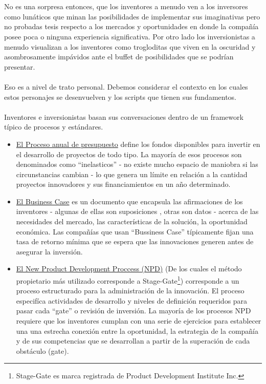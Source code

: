 \documentclass{article}
\begin{document}
\\ \\
No es una sorpresa entonces, que los inventores a menudo ven a los inversores como lun\'aticos que minan las posibilidades de implementar sus imaginativas pero no probadas tesis respecto a los mercados y oportunidades en donde la compa\~n\'ia posee poca o ninguna experiencia significativa. Por otro lado los inversionistas a menudo visualizan a los inventores como trogloditas que viven en la oscuridad y asombrosamente imp\'avidos ante el buffet de posibilidades que se podr\'ian presentar.
\\ \\
Eso es a nivel de trato personal. Debemos considerar el contexto en los cuales estos personajes se desenvuelven y los scripts que tienen sus fundamentos. 
\\ \\
Inventores e inversionistas basan sus conversaciones dentro de un framework t\'ipico de procesos y est\'andares.

\begin{itemize}
  \item \underline{El Proceso anual de presupuesto} define los fondos disponibles para invertir en el desarrollo de proyectos de todo tipo. La mayor\'ia  de esos procesos son denominados como ``inelasticos'' - no existe mucho espacio de maniobra si las circunstancias cambian - lo que genera un l\'imite en relaci\'on a la cantidad proyectos innovadores y sus financiamientos en un a\~no determinado.
  
  \item \underline{El Business Case} es un documento que encapsula las afirmaciones de los inventores - algunas de ellas son suposiciones , otras son datos  - acerca de las necesidades del mercado, las caracter\'isticas de la soluci\'on, la oportunidad econ\'omica. Las compa\~n\'ias que usan ``Bussiness Case'' t\'ipicamente fijan una tasa de retorno m\'inima que se espera que las innovaciones generen antes de asegurar la inversi\'on.
  
  \item \underline{El New Product Development Proccess (NPD)} (De los cuales el m\'etodo propietario m\'as utilizado corresponde a Stage-Gate\footnote{Stage-Gate es marca registrada de Product Development Institute Inc.}) corresponde a un proceso estructurado para la administraci\'on de la innovaci\'on. El proceso especif\'ica actividades de desarrollo y niveles de definici\'on requeridos para pasar cada ``gate'' o revisi\'on de inversi\'on. La mayor\'ia de los procesos NPD requiere que los inventores cumplan con una serie de ejercicios para establecer una una estrecha conexi\'on entre la oportunidad, la  estrategia de la compa\~n\'ia y de sus competencias que se desarrollan a partir de la superaci\'on de cada obst\'aculo (gate).
\end{itemize}
\end{document}
